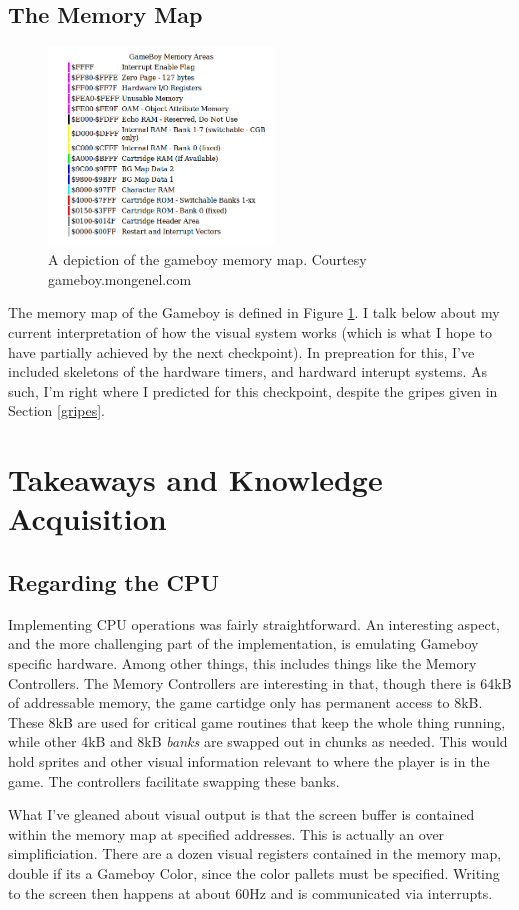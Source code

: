 \documentclass{article}
\begin{document}
    \subsection{The Memory Map}
    \begin{figure}[h]
        \centering
        \includegraphics[width=6cm, keepaspectratio]{memmap}
        \caption{A depiction of the gameboy memory map. Courtesy gameboy.mongenel.com}
        \label{fig:memmap}
    \end{figure}
    The memory map of the Gameboy is defined in Figure \ref{fig:memmap}. 
    I talk below about my current interpretation of how the visual system works (which is what I hope to have partially achieved 
    by the next checkpoint). 
    In prepreation for this, I've included skeletons of the hardware timers, and hardward interupt systems.
    As such, I'm right where I predicted for this checkpoint, despite the gripes given in Section \ref{gripes}.
    \section{Takeaways and Knowledge Acquisition}
    \subsection{Regarding the CPU}
    Implementing CPU operations was fairly straightforward. 
    An interesting aspect, and the more challenging part of the implementation, is emulating Gameboy specific hardware. 
    Among other things, this includes things like the Memory Controllers.
    The Memory Controllers are interesting in that, though there is 64kB of addressable memory, the game cartidge only has 
    permanent access to 8kB. 
    These 8kB are used for critical game routines that keep the whole thing running, while other 4kB and 8kB \textit{banks} are swapped 
    out in chunks as needed. 
    This would hold sprites and other visual information relevant to where the player is in the game.
    The controllers facilitate swapping these banks.
    \par
    What I've gleaned about visual output is that the screen buffer is contained within the memory map at specified addresses. 
    This is actually an over simplificiation. There are a dozen visual registers contained in the memory map, double if its a 
    Gameboy Color, since the color pallets must be specified. 
    Writing to the screen then happens at about 60Hz and is communicated via interrupts.
\end{document}
